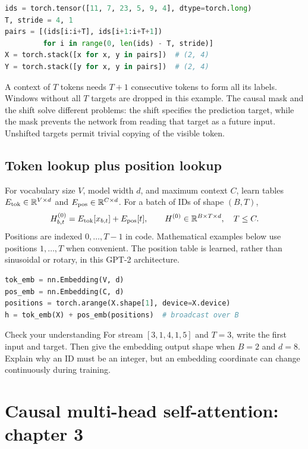 \documentclass[11pt]{article}
\begin{document}
\begin{lstlisting}[language=Python]
ids = torch.tensor([11, 7, 23, 5, 9, 4], dtype=torch.long)
T, stride = 4, 1
pairs = [(ids[i:i+T], ids[i+1:i+T+1])
         for i in range(0, len(ids) - T, stride)]
X = torch.stack([x for x, y in pairs])  # (2, 4)
Y = torch.stack([y for x, y in pairs])  # (2, 4)
\end{lstlisting}

A context of $T$ tokens needs $T+1$ consecutive tokens to form all its labels.
Windows without all $T$ targets are dropped in this example. The causal mask
and the shift solve different problems: the shift specifies the prediction
target, while the mask prevents the network from reading that target as a
future input. Unshifted targets permit trivial copying of the visible token.

\subsection{Token lookup plus position lookup}
For vocabulary size $V$, model width $d$, and maximum context $C$, learn tables
$E_{\rm tok}\in\mathbb R^{V\times d}$ and
$E_{\rm pos}\in\mathbb R^{C\times d}$. For a batch of IDs of shape $(B,T)$,
\[
H^{(0)}_{b,t}=E_{\rm tok}[x_{b,t}]+E_{\rm pos}[t],
\qquad H^{(0)}\in\mathbb R^{B\times T\times d},\quad T\le C.
\]
Positions are indexed $0,\ldots,T-1$ in code. Mathematical examples below use
positions $1,\ldots,T$ when convenient. The position table is learned, rather
than sinusoidal or rotary, in this GPT-2 architecture.
\begin{lstlisting}[language=Python]
tok_emb = nn.Embedding(V, d)
pos_emb = nn.Embedding(C, d)
positions = torch.arange(X.shape[1], device=X.device)
h = tok_emb(X) + pos_emb(positions)  # broadcast over B
\end{lstlisting}

\begin{studybox}{Check your understanding}
For stream $[3,1,4,1,5]$ and $T=3$, write the first input and target. Then give
the embedding output shape when $B=2$ and $d=8$. Explain why an ID must be an
integer, but an embedding coordinate can change continuously during training.
\end{studybox}

\section{Causal multi-head self-attention: chapter 3}
\label{sec:attention}
\end{document}
